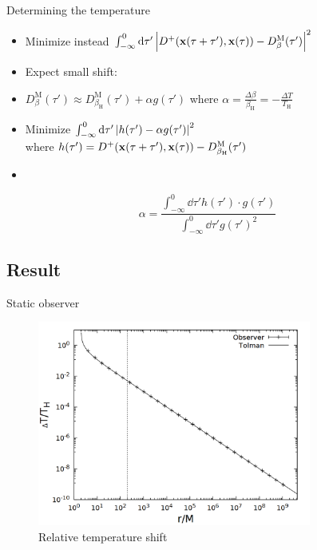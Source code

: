 \documentclass{beamer}
\newcommand{\upd}[1]{^\mathrm{#1}}
\newcommand{\ind}[1]{_\mathrm{#1}}
\begin{document}
\begin{frame}{Determining the temperature}
\begin{itemize}
	\item Minimize instead \(\int_{-\infty}^0 \dd{\tau'} \qty|D^+(\vb{x}(\tau + \tau'), \vb{x}(\tau)) - D_\beta\upd{M}(\tau')|^2\)
	\item Expect small shift: 
	\item[] \(D_\beta\upd{M}(\tau') \approx D_{\beta\ind{H}}\upd{M}(\tau') + \alpha g(\tau')\) where \(\alpha = \frac{\Delta\beta}{\beta\ind{H}} = - \frac{\Delta T}{T\ind{H}}\)
	\item Minimize \(\int_{-\infty}^0 \dd{\tau'} \qty|h(\tau') - \alpha g(\tau')|^2\)\\
	where \(h(\tau') = D^+(\vb{x}(\tau + \tau'), \vb{x}(\tau)) - D_{\beta\ind{H}}\upd{M}(\tau')\)
	\item[]
\end{itemize}
\[\alpha = \frac{\int_{-\infty}^0 \dd{\tau'} h(\tau')\cdot g(\tau')}{\int_{-\infty}^0 \dd{\tau'} g(\tau')^2}\] 
\end{frame}

\subsection{Result}
\begin{frame}{Static observer}
\begin{figure}
	\centering
    \includegraphics[width=9cm]{../cpp/final/stat.png}
    \caption{Relative temperature shift}
\end{figure}
\end{frame}
\end{document}
